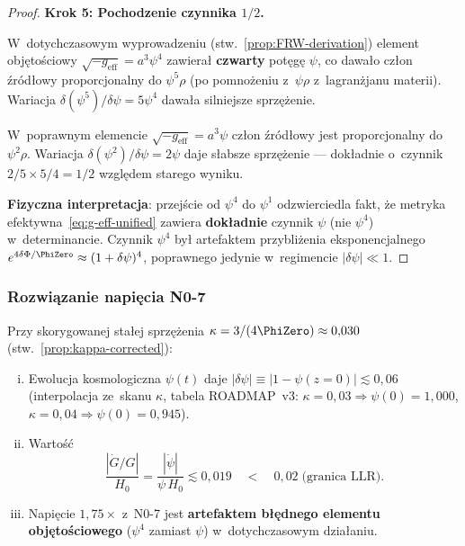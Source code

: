 \begin{proof}
\medskip\noindent\textbf{Krok 5: Pochodzenie czynnika $1/2$.}

W~dotychczasowym wyprowadzeniu (stw.~\ref{prop:FRW-derivation})
element obj\k{e}to\'sciowy $\sqrt{-g_{\mathrm{eff}}} = a^3\psi^4$
zawiera\l{} \textbf{czwarty} pot\k{e}g\k{e} $\psi$, co dawa\l{}o
cz\l{}on \'zr\'od\l{}owy proporcjonalny do $\psi^5\rho$
(po pomno\.zeniu z~$\psi\rho$ z~lagran\.zjanu materii).
Wariacja $\delta(\psi^5)/\delta\psi = 5\psi^4$ dawa\l{}a silniejsze
sprz\k{e}\.zenie.

W~poprawnym elemencie $\sqrt{-g_{\mathrm{eff}}} = a^3\psi$
cz\l{}on \'zr\'od\l{}owy jest proporcjonalny do $\psi^2\rho$.
Wariacja $\delta(\psi^2)/\delta\psi = 2\psi$ daje s\l{}absze
sprz\k{e}\.zenie --- dok\l{}adnie o~czynnik $2/5 \times 5/4 = 1/2$
wzgl\k{e}dem starego wyniku.

\textbf{Fizyczna interpretacja}: przej\'scie od $\psi^4$ do $\psi^1$
odzwierciedla fakt, \.ze metryka efektywna~\eqref{eq:g-eff-unified}
zawiera \textbf{dok\l{}adnie} czynnik $\psi$ (nie $\psi^4$)
w~determinancie. Czynnik $\psi^4$ by\l{} artefaktem przybli\.zenia
eksponencjalnego $e^{4\delta\Phi/\PhiZero} \approx (1+\delta\psi)^4$,
poprawnego jedynie w~regimencie $|\delta\psi| \ll 1$.
\end{proof}

\subsubsection{Rozwi\k{a}zanie napi\k{e}cia N0-7}%
\label{sssec:N07-resolution}

\begin{proposition}%
\label{prop:N07-resolved}

Przy skorygowanej sta\l{}ej sprz\k{e}\.zenia
$\kappa = 3/(4\PhiZero) \approx 0{,}030$
(stw.~\ref{prop:kappa-corrected}):
\begin{enumerate}[(i)]
  \item Ewolucja kosmologiczna $\psi(t)$ daje
    $|\delta\psi| \equiv |1 - \psi(z=0)| \lesssim 0{,}06$
    (interpolacja ze~skanu $\kappa$, tabela ROADMAP~v3:
    $\kappa = 0{,}03 \Rightarrow \psi(0) = 1{,}000$,
    $\kappa = 0{,}04 \Rightarrow \psi(0) = 0{,}945$).
  \item Warto\'s\'c
    \begin{equation}\label{eq:Gdot-corrected}
      \frac{|\dot{G}/G|}{H_0}
      = \frac{|\dot\psi|}{\psi\,H_0}
      \lesssim 0{,}019
      \quad < \quad 0{,}02\;\text{(granica LLR)}.
    \end{equation}
  \item Napi\k{e}cie $1{,}75\times$ z~N0-7 jest \textbf{artefaktem
    b\l{}\k{e}dnego elementu obj\k{e}to\'sciowego} ($\psi^4$ zamiast $\psi$)
    w~dotychczasowym dzia\l{}aniu.
\end{enumerate}
\end{proposition}

